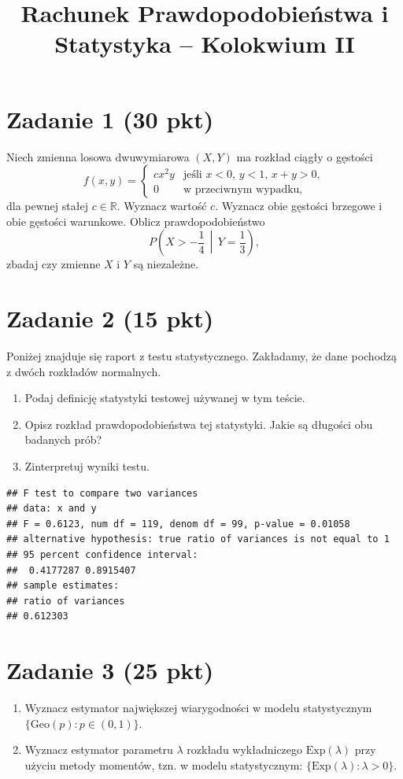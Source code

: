 \documentclass[polish, 10pt]{extarticle}
\begin{document}
\title{Rachunek Prawdopodobieństwa i Statystyka -- Kolokwium II}
\author{}
\date{}

\maketitle
\vspace{-2cm}

\section*{Zadanie 1 (30 pkt)}
Niech zmienna losowa dwuwymiarowa \((X, Y)\) ma rozkład ciągły o gęstości
\[
f(x, y) =
\begin{cases}
    c x^2 y & \text{jeśli } x < 0, \, y < 1, \, x + y > 0, \\
    0 & \text{w przeciwnym wypadku},
\end{cases}
\]
dla pewnej stałej \(c \in \mathbb{R}\). Wyznacz wartość \(c\). Wyznacz obie gęstości brzegowe i obie gęstości warunkowe. Oblicz prawdopodobieństwo
\[
P\left(X > -\frac{1}{4} \, \middle| \, Y = \frac{1}{3} \right),
\]
zbadaj czy zmienne $X$ i $Y$ są niezależne.

\section*{Zadanie 2 (15 pkt)}
\noindent Poniżej znajduje się raport z testu statystycznego. Zakładamy, że dane pochodzą z dwóch rozkładów normalnych.

\begin{enumerate}
    \item[a)] Podaj definicję statystyki testowej używanej w tym teście.
    \item[b)] Opisz rozkład prawdopodobieństwa tej statystyki. Jakie są długości obu badanych prób?
    \item[c)] Zinterpretuj wyniki testu.
\end{enumerate}

\begin{verbatim}
## F test to compare two variances
## data: x and y
## F = 0.6123, num df = 119, denom df = 99, p-value = 0.01058
## alternative hypothesis: true ratio of variances is not equal to 1
## 95 percent confidence interval:
##  0.4177287 0.8915407
## sample estimates:
## ratio of variances
## 0.612303
\end{verbatim}

\section*{Zadanie 3 (25 pkt)}
\begin{enumerate}
    \item[a)] Wyznacz estymator największej wiarygodności w modelu statystycznym $\{ \text{Geo}(p) : p \in (0, 1) \}$.

    \item[b)] Wyznacz estymator parametru $\lambda$ rozkładu wykładniczego $\text{Exp}(\lambda)$ przy użyciu metody momentów, tzn. w modelu statystycznym: $\{ \text{Exp}(\lambda) : \lambda > 0 \}$.

\end{enumerate}
\end{document}
